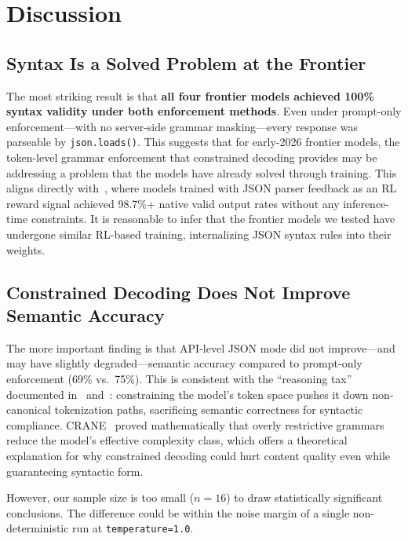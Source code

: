 \documentclass[11pt, letterpaper]{article}
\begin{document}
\section{Discussion}
\label{sec:discussion}

\subsection{Syntax Is a Solved Problem at the Frontier}
\label{sec:syntax_solved}

The most striking result is that \textbf{all four frontier models achieved 100\% syntax validity under both enforcement methods}. Even under prompt-only enforcement---with no server-side grammar masking---every response was parseable by \texttt{json.loads()}. This suggests that for early-2026 frontier models, the token-level grammar enforcement that constrained decoding provides may be addressing a problem that the models have already solved through training. This aligns directly with~\cite{rl_json}, where models trained with JSON parser feedback as an RL reward signal achieved 98.7\%+ native valid output rates without any inference-time constraints. It is reasonable to infer that the frontier models we tested have undergone similar RL-based training, internalizing JSON syntax rules into their weights.

\subsection{Constrained Decoding Does Not Improve Semantic Accuracy}
\label{sec:semantic}

The more important finding is that API-level JSON mode did not improve---and may have slightly degraded---semantic accuracy compared to prompt-only enforcement (69\% vs.\ 75\%). This is consistent with the ``reasoning tax'' documented in~\cite{causal_inference} and~\cite{crane}: constraining the model's token space pushes it down non-canonical tokenization paths, sacrificing semantic correctness for syntactic compliance. CRANE~\cite{crane} proved mathematically that overly restrictive grammars reduce the model's effective complexity class, which offers a theoretical explanation for why constrained decoding could hurt content quality even while guaranteeing syntactic form.

However, our sample size is too small ($n=16$) to draw statistically significant conclusions. The difference could be within the noise margin of a single non-deterministic run at \texttt{temperature=1.0}.
\end{document}
